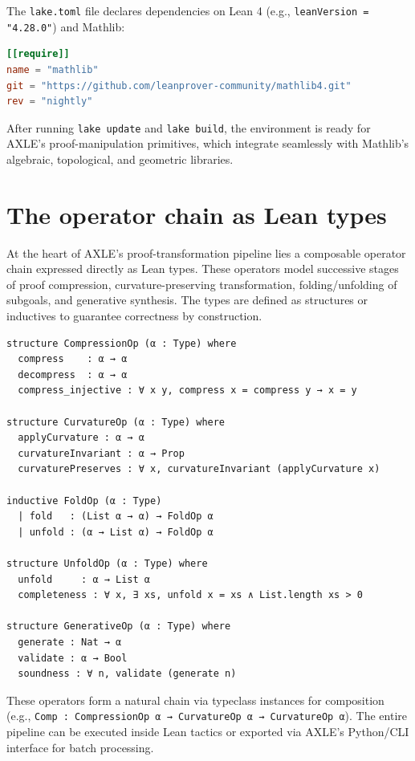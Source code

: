 \documentclass[19pt]{book}
\theoremstyle{plain}
\theoremstyle{definition}
\theoremstyle{remark}
\begin{document}
The \texttt{lake.toml} file declares dependencies on Lean 4 (e.g., \texttt{leanVersion = "4.28.0"}) and Mathlib:

\begin{lstlisting}[language=Toml]
[[require]]
name = "mathlib"
git = "https://github.com/leanprover-community/mathlib4.git"
rev = "nightly"
\end{lstlisting}

After running \texttt{lake update} and \texttt{lake build}, the environment is ready for AXLE’s proof-manipulation primitives, which integrate seamlessly with Mathlib’s algebraic, topological, and geometric libraries.

\section{The operator chain as Lean types}

At the heart of AXLE’s proof-transformation pipeline lies a composable operator chain expressed directly as Lean types. These operators model successive stages of proof compression, curvature-preserving transformation, folding/unfolding of subgoals, and generative synthesis. The types are defined as structures or inductives to guarantee correctness by construction.

\begin{lstlisting}[language=Lean,caption={Core operator types in AXLE}]
structure CompressionOp (α : Type) where
  compress    : α → α
  decompress  : α → α
  compress_injective : ∀ x y, compress x = compress y → x = y

structure CurvatureOp (α : Type) where
  applyCurvature : α → α
  curvatureInvariant : α → Prop
  curvaturePreserves : ∀ x, curvatureInvariant (applyCurvature x)

inductive FoldOp (α : Type)
  | fold   : (List α → α) → FoldOp α
  | unfold : (α → List α) → FoldOp α

structure UnfoldOp (α : Type) where
  unfold     : α → List α
  completeness : ∀ x, ∃ xs, unfold x = xs ∧ List.length xs > 0

structure GenerativeOp (α : Type) where
  generate : Nat → α
  validate : α → Bool
  soundness : ∀ n, validate (generate n)
\end{lstlisting}

These operators form a natural chain via typeclass instances for composition (e.g., \texttt{Comp : CompressionOp α → CurvatureOp α → CurvatureOp α}). The entire pipeline can be executed inside Lean tactics or exported via AXLE’s Python/CLI interface for batch processing.
\end{document}
